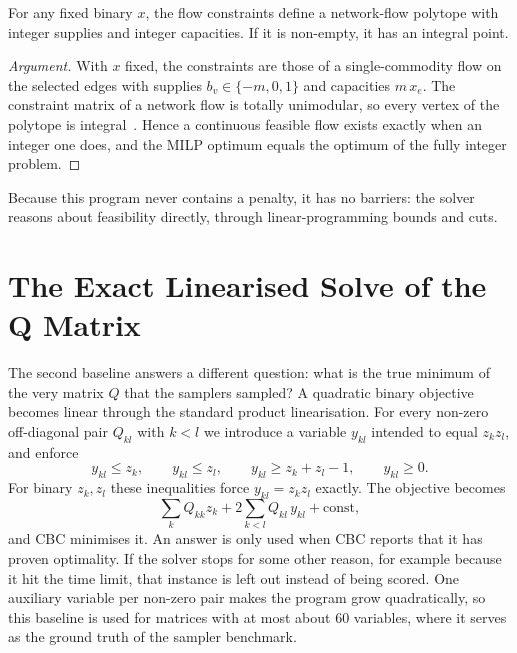 \begin{proposition}
For any fixed binary $x$, the flow constraints define a network-flow
polytope with integer supplies and integer capacities. If it is non-empty,
it has an integral point.
\end{proposition}

\begin{proof}[Argument]
With $x$ fixed, the constraints are those of a single-commodity flow on the
selected edges with supplies $b_v\in\{-m,0,1\}$ and capacities $m\,x_e$. The
constraint matrix of a network flow is totally unimodular, so every vertex
of the polytope is integral~\cite{ahuja1993}. Hence a continuous feasible
flow exists exactly when an integer one does, and the MILP optimum equals the
optimum of the fully integer problem.
\end{proof}

Because this program never contains a penalty, it has no barriers: the
solver reasons about feasibility directly, through linear-programming bounds
and cuts.

\section{The Exact Linearised Solve of the Q Matrix}

The second baseline answers a different question: what is the true minimum
of the very matrix $Q$ that the samplers sampled? A quadratic binary
objective becomes linear through the standard product linearisation. For
every non-zero off-diagonal pair $Q_{kl}$ with $k<l$ we introduce a variable
$y_{kl}$ intended to equal $z_kz_l$, and enforce
\begin{equation}
y_{kl}\le z_k,\qquad y_{kl}\le z_l,\qquad y_{kl}\ge z_k+z_l-1,\qquad
y_{kl}\ge0.
\label{eq:exact:lin}
\end{equation}
For binary $z_k,z_l$ these inequalities force $y_{kl}=z_kz_l$ exactly. The
objective becomes
\begin{equation}
\sum_k Q_{kk}z_k+2\sum_{k<l}Q_{kl}\,y_{kl}+\mathrm{const},
\end{equation}
and CBC minimises it. An answer is only used when CBC reports that it has
proven optimality. If the solver stops for some other reason, for example
because it hit the time limit, that instance is left out instead of being
scored. One auxiliary variable per
non-zero pair makes the program grow quadratically, so this baseline is used
for matrices with at most about 60 variables, where it serves as the ground
truth of the sampler benchmark.

